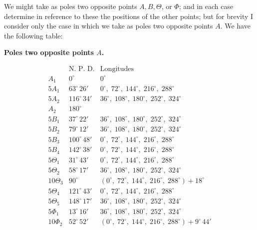 \documentclass[11pt,a4paper]{article}
\begin{document}
We might take as poles two opposite points $A, B, \Theta$, or $\Phi$; and in each case determine in reference to these the positions of the other points; but for brevity I consider only the case in which we take as poles two opposite points $A$. We have the following table:
\begin{center}
\textbf{Poles two opposite points $A$.}
\end{center}
\[
\begin{array}{l|ll}
& \text{N.\ P.\ D.} & \text{Longitudes}\\
\hline
A_{1} & 0^{\circ} & 0^{\circ}\\
5A_{1} & 63^{\circ}\,26' & 0^{\circ},\; 72^{\circ},\; 144^{\circ},\; 216^{\circ},\; 288^{\circ}\\
5A_{2} & 116^{\circ}\,34' & 36^{\circ},\; 108^{\circ},\; 180^{\circ},\; 252^{\circ},\; 324^{\circ}\\
A_{2} & 180^{\circ} & \\[4pt]
5B_{1} & 37^{\circ}\,22' & 36^{\circ},\; 108^{\circ},\; 180^{\circ},\; 252^{\circ},\; 324^{\circ}\\
5B_{2} & 79^{\circ}\,12' & 36^{\circ},\; 108^{\circ},\; 180^{\circ},\; 252^{\circ},\; 324^{\circ}\\
5B_{3} & 100^{\circ}\,48' & 0^{\circ},\; 72^{\circ},\; 144^{\circ},\; 216^{\circ},\; 288^{\circ}\\
5B_{4} & 142^{\circ}\,38' & 0^{\circ},\; 72^{\circ},\; 144^{\circ},\; 216^{\circ},\; 288^{\circ}\\[4pt]
5\Theta_{1} & 31^{\circ}\,43' & 0^{\circ},\; 72^{\circ},\; 144^{\circ},\; 216^{\circ},\; 288^{\circ}\\
5\Theta_{2} & 58^{\circ}\,17' & 36^{\circ},\; 108^{\circ},\; 180^{\circ},\; 252^{\circ},\; 324^{\circ}\\
10\Theta_{3} & 90^{\circ} & (0^{\circ},\; 72^{\circ},\; 144^{\circ},\; 216^{\circ},\; 288^{\circ}) + 18^{\circ}\\
5\Theta_{4} & 121^{\circ}\,43' & 0^{\circ},\; 72^{\circ},\; 144^{\circ},\; 216^{\circ},\; 288^{\circ}\\
5\Theta_{5} & 148^{\circ}\,17' & 36^{\circ},\; 108^{\circ},\; 180^{\circ},\; 252^{\circ},\; 324^{\circ}\\[4pt]
5\Phi_{1} & 13^{\circ}\,16' & 36^{\circ},\; 108^{\circ},\; 180^{\circ},\; 252^{\circ},\; 324^{\circ}\\
10\Phi_{2} & 52^{\circ}\,52' & (0^{\circ},\; 72^{\circ},\; 144^{\circ},\; 216^{\circ},\; 288^{\circ}) + 9^{\circ}\,44'\\

\end{array}\]
\end{document}
